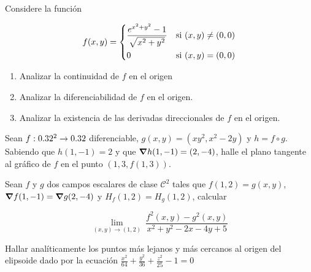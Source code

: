 
\begin{question}
    Considere la función

     \[
        f(x,y) =
        \begin{dcases}
            \frac{e^{x^{2}+y^{2}}-1}{\sqrt{x^{2}+y^{2}}} & \textnormal{si}\ (x,y) \neq (0,0) \\
            0                         & \textnormal{si}\ (x,y) = (0,0)
        \end{dcases}
    \]

    \begin{enumerate}
        \item Analizar la continuidad de $f$ en el origen
        \item Analizar la diferenciabilidad de $f$ en el origen.
        \item Analizar la existencia de las derivadas direccionales de $f$ en el origen.\\
    \end{enumerate}
\end{question}

\begin{question}
    Sean $f:0.32^2\to0.32$ diferenciable, $g(x,y)=(xy^2,x^2-2y)$ y $h=f\circ g$. Sabiendo que $h(1,-1) = 2$ y que $\grad h(1,-1)=(2,-4)$, halle el plano tangente al gráfico de $f$ en el punto $(1,3,f(1,3))$.
\end{question}
\begin{question}
    Sean $f$ y $g$ dos campos escalares de clase $\mathcal{C}^2$ tales que $f(1,2)=g(x,y)$, $\grad f(1,-1)=\grad g(2,-4)$ y $H_f(1,2)=H_g(1,2)$, calcular 
    
\[
        \lim_{(x,y)\to(1,2)} \
        \frac{f^2(x,y)-g^2(x,y)}{x^2+y^2-2x-4y+5}
    \]
\end{question}
\begin{question}
    Hallar analíticamente los puntos más lejanos y más cercanos al origen del elipsoide dado por la ecuación {\large$\frac{x^2}{64}+\frac{y^2}{36}+\frac{z^2}{25}-1=0$}
\end{question}
\newpage

